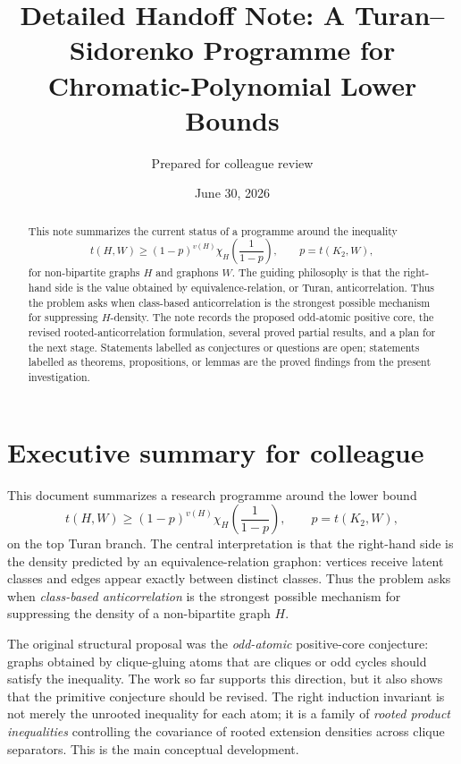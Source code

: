 \documentclass[11pt]{article}
\title{Detailed Handoff Note: A Turan--Sidorenko Programme for Chromatic-Polynomial Lower Bounds}\author{Prepared for colleague review}\date{June 30, 2026}
\theoremstyle{definition}
\begin{document}
\maketitle

\begin{abstract}
This note summarizes the current status of a programme around the inequality
\[
  t(H,W)\ge (1-p)^{v(H)}\chi_H\!\left(\frac1{1-p}\right),
  \qquad p=t(K_2,W),
\]
for non-bipartite graphs $H$ and graphons $W$.  The guiding philosophy is that the right-hand side is the value obtained by equivalence-relation, or Turan, anticorrelation.  Thus the problem asks when class-based anticorrelation is the strongest possible mechanism for suppressing $H$-density.  The note records the proposed odd-atomic positive core, the revised rooted-anticorrelation formulation, several proved partial results, and a plan for the next stage.  Statements labelled as conjectures or questions are open; statements labelled as theorems, propositions, or lemmas are the proved findings from the present investigation.
\end{abstract}



\section*{Executive summary for colleague}
This document summarizes a research programme around the lower bound
\[
        t(H,W)\ge (1-p)^{v(H)}\chi_H\!\left(\frac1{1-p}\right),
        \qquad p=t(K_2,W),
\]
on the top Turan branch.  The central interpretation is that the right-hand side is the density predicted by an equivalence-relation graphon: vertices receive latent classes and edges appear exactly between distinct classes.  Thus the problem asks when \emph{class-based anticorrelation} is the strongest possible mechanism for suppressing the density of a non-bipartite graph $H$.

The original structural proposal was the \emph{odd-atomic} positive-core conjecture: graphs obtained by clique-gluing atoms that are cliques or odd cycles should satisfy the inequality.  The work so far supports this direction, but it also shows that the primitive conjecture should be revised.  The right induction invariant is not merely the unrooted inequality for each atom; it is a family of \emph{rooted product inequalities} controlling the covariance of rooted extension densities across clique separators.  This is the main conceptual development.
\end{document}

